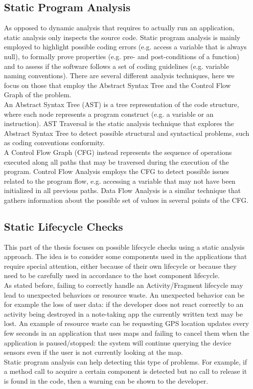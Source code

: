 \documentclass[11pt,a4paper,notitlepage]{article}
\begin{document}
\subsection{Static Program Analysis}
As opposed to dynamic analysis that requires to actually run an application, static analysis only inspects the source code. Static program analysis is mainly employed to highlight possible coding errors (e.g. access a variable that is always null), to formally prove properties (e.g. pre- and post-conditions of a function) and to assess if the software follows a set of coding guidelines (e.g. variable naming conventions). There are several different analysis techniques, here we focus on those that employ the Abstract Syntax Tree and the Control Flow Graph of the problem.\medskip \\
An Abstract Syntax Tree (AST) is a tree representation of the code structure, where each node represents a program construct (e.g. a variable or an instruction). AST Traversal is the static analysis technique that explores the Abstract Syntax Tree to detect possible structural and syntactical problems, such as coding conventions conformity.\medskip \\
A Control Flow Graph (CFG) instead represents the sequence of operations executed along all paths that may be traversed during the execution of the program. Control Flow Analysis employs the CFG to detect possible issues related to the program flow, e.g. accessing a variable that may not have been initialized in all previous paths. Data Flow Analysis is a similar technique that gathers information about the possible set of values in several points of the CFG.

\subsection{Static Lifecycle Checks}
This part of the thesis focuses on possible lifecycle checks using a static analysis approach. The idea is to consider some components used in the applications that require special attention, either because of their own lifecycle or because they need to be carefully used in accordance to the host component lifecycle.\medskip \\
As stated before, failing to correctly handle an Activity/Fragment lifecycle may lead to unexpected behaviors or resource waste. An unexpected behavior can be for example the loss of user data: if the developer does not react correctly to an activity being destroyed in a note-taking app the currently written text may be lost. An example of resource waste can be requesting GPS location updates every few seconds in an application that uses maps and failing to cancel them when the application is paused/stopped: the system will continue querying the device sensors even if the user is not currently looking at the map.\bigskip \\
Static program analysis can help detecting this type of problems. For example, if a method call to acquire a certain component is detected but no call to release it is found in the code, then a warning can be shown to the developer.
\end{document}
